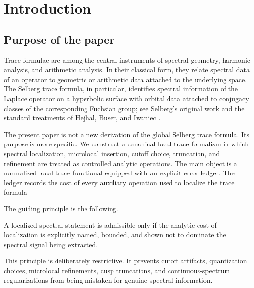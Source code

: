 
\chapter{Introduction}
\label{ch:introduction}

\section{Purpose of the paper}
\label{sec:intro-purpose}

Trace formulae are among the central instruments of spectral geometry, harmonic analysis, and arithmetic analysis.  In their classical form, they relate spectral data of an operator to geometric or arithmetic data attached to the underlying space.  The Selberg trace formula, in particular, identifies spectral information of the Laplace operator on a hyperbolic surface with orbital data attached to conjugacy classes of the corresponding Fuchsian group; see Selberg's original work and the standard treatments of Hejhal, Buser, and Iwaniec \cite{Selberg1956,Hejhal1976,Hejhal1983,Buser1992,Iwaniec2002}.

The present paper is not a new derivation of the global Selberg trace formula.  Its purpose is more specific.  We construct a canonical local trace formalism in which spectral localization, microlocal insertion, cutoff choice, truncation, and refinement are treated as controlled analytic operations.  The main object is a normalized local trace functional equipped with an explicit error ledger.  The ledger records the cost of every auxiliary operation used to localize the trace formula.

The guiding principle is the following.

\begin{principle}
\label{prin:ledger-principle}
A localized spectral statement is admissible only if the analytic cost of localization is explicitly named, bounded, and shown not to dominate the spectral signal being extracted.
\end{principle}

This principle is deliberately restrictive.  It prevents cutoff artifacts, quantization choices, microlocal refinements, cusp truncations, and continuous-spectrum regularizations from being mistaken for genuine spectral information.

